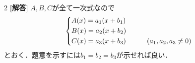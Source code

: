 \documentclass[../../main.tex]{subfiles}
\begin{document}
\setcounter{equation}{0}
\begin{oframed}
  
\end{oframed}
\setlength{\columnseprule}{0.4pt}
\begin{multicols}{2}
  {\bf [解答]}
  $A,B,C$が全て一次式なので
  \begin{align}
    \begin{dcases}
      A(x) = a_1(x + b_1)                                 \\
      B(x) = a_2(x + b_2)                                 \\
      C(x) = a_3(x + b_3) & \qquad (a_1, a_2, a_3 \neq 0)
    \end{dcases}
  \end{align}
  とおく．題意を示すには$b_1=b_2=b_3$が示せれば良い．


\end{multicols}
\end{document}
